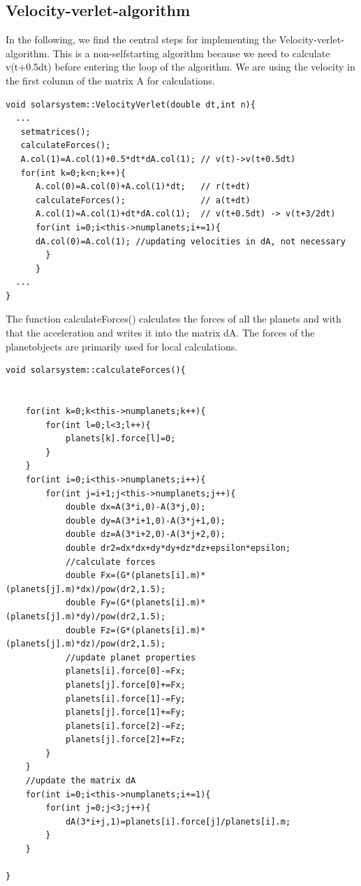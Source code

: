 \documentclass[10pt,a4paper]{article}
\begin{document}
\subsection{Velocity-verlet-algorithm}
In the following, we find the central steps for implementing the Velocity-verlet-algorithm. This is a non-selfstarting algorithm because we need to calculate v(t+0.5dt) before entering the loop of the algorithm. We are using the velocity in the first column of the matrix A for calculations.  
\begin{lstlisting}
void solarsystem::VelocityVerlet(double dt,int n){
  ...
   setmatrices();
   calculateForces();                              
   A.col(1)=A.col(1)+0.5*dt*dA.col(1); // v(t)->v(t+0.5dt)
   for(int k=0;k<n;k++){
      A.col(0)=A.col(0)+A.col(1)*dt;   // r(t+dt)
      calculateForces();               // a(t+dt)
      A.col(1)=A.col(1)+dt*dA.col(1);  // v(t+0.5dt) -> v(t+3/2dt)
      for(int i=0;i<this->numplanets;i+=1){
      dA.col(0)=A.col(1); //updating velocities in dA, not necessary
        }
      }
  ...
}
\end{lstlisting}
The function calculateForces() calculates the forces of all the planets and with that the acceleration and writes it into the matrix dA. The forces of the planetobjects are primarily used for local calculations. 
\begin{lstlisting}
void solarsystem::calculateForces(){

    
    for(int k=0;k<this->numplanets;k++){
        for(int l=0;l<3;l++){
            planets[k].force[l]=0;
        }
    }
    for(int i=0;i<this->numplanets;i++){
        for(int j=i+1;j<this->numplanets;j++){
            double dx=A(3*i,0)-A(3*j,0);
            double dy=A(3*i+1,0)-A(3*j+1,0);
            double dz=A(3*i+2,0)-A(3*j+2,0);
            double dr2=dx*dx+dy*dy+dz*dz+epsilon*epsilon;
            //calculate forces
            double Fx=(G*(planets[i].m)*(planets[j].m)*dx)/pow(dr2,1.5);
            double Fy=(G*(planets[i].m)*(planets[j].m)*dy)/pow(dr2,1.5);
            double Fz=(G*(planets[i].m)*(planets[j].m)*dz)/pow(dr2,1.5);
            //update planet properties
            planets[i].force[0]-=Fx;
            planets[j].force[0]+=Fx;
            planets[i].force[1]-=Fy;
            planets[j].force[1]+=Fy;
            planets[i].force[2]-=Fz;
            planets[j].force[2]+=Fz;
        }
    }
    //update the matrix dA
    for(int i=0;i<this->numplanets;i+=1){
        for(int j=0;j<3;j++){
            dA(3*i+j,1)=planets[i].force[j]/planets[i].m;
        }
    }
    
}
\end{lstlisting}
\end{document}
